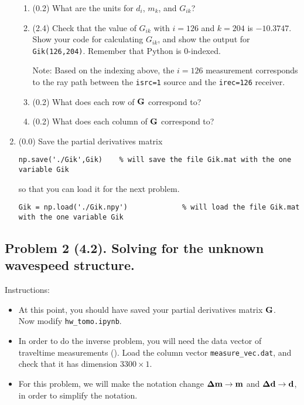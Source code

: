 \documentclass[11pt,titlepage,fleqn]{article}
\newcommand{\tfiletomo}{{\tt hw\_tomo.ipynb}}
\begin{document}
\begin{enumerate}
\begin{itemize}
\end{itemize}

\begin{enumerate}
\item (0.2) What are the units for $d_i$, $m_k$, and $G_{ik}$?

\item (2.4) Check that the value of $G_{ik}$ with $i=126$ and $k=204$ is $-10.3747$. \\ Show your code for calculating $G_{ik}$, and show the output for \verb+Gik(126,204)+. Remember that Python is 0-indexed.

Note: Based on the indexing above, the $i=126$ measurement corresponds to the ray path between the \verb+isrc=1+ source and the \verb+irec=126+ receiver.

\item (0.2) What does each row of $\mbox{${\bf G}$}$ correspond to?

\item (0.2) What does each column of $\mbox{${\bf G}$}$ correspond to?
\end{enumerate}


\item (0.0) Save the partial derivatives matrix
%
\begin{verbatim}
np.save('./Gik',Gik)    % will save the file Gik.mat with the one variable Gik
\end{verbatim}
%
so that you can load it for the next problem.
%
\begin{verbatim}
Gik = np.load('./Gik.npy')             % will load the file Gik.mat with the one variable Gik
\end{verbatim}

\end{enumerate}


\subsection*{Problem 2 (4.2). Solving for the unknown wavespeed structure.}

Instructions:
%
\begin{itemize}
\item At this point, you should have saved your partial derivatives matrix $\mbox{${\bf G}$}$. \\ Now modify \tfiletomo.

\item In order to do the inverse problem, you will need the data vector of traveltime measurements (). Load the column vector \verb+measure_vec.dat+, and check that it has dimension $3300 \times 1$.

\item For this problem, we will make the notation change $\mbox{\boldmath $\bf \Delta$}\mbox{${\bf m}$} \rightarrow \mbox{${\bf m}$}$ and $\mbox{\boldmath $\bf \Delta$}\mbox{${\bf d}$} \rightarrow \mbox{${\bf d}$}$, in order to simplify the notation.
\end{itemize}
\end{document}

